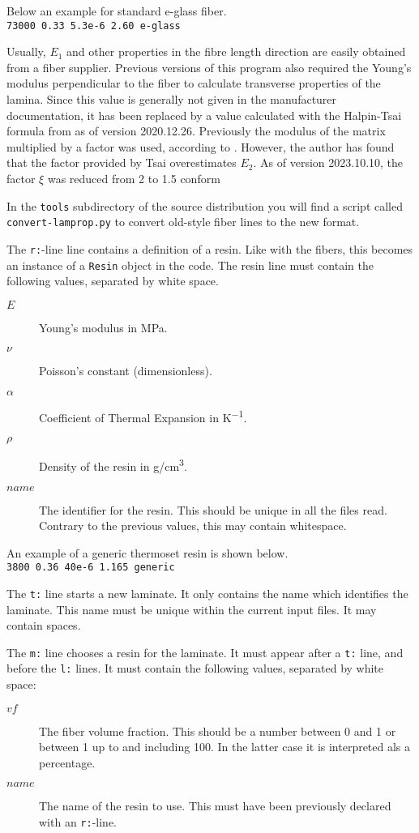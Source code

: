 \documentclass[a4paper,landscape,oneside,11pt,twocolumn]{memoir}
\begin{document}
Below an example for standard e-glass fiber.\\
\texttt{73000 0.33 5.3e-6 2.60 e-glass}

Usually, $E_1$ and other properties in the fibre length direction are easily
obtained from a fiber supplier. Previous versions of this program also
required the Young's modulus perpendicular to the fiber to calculate
transverse properties of the lamina. Since this value is generally not given
in the manufacturer documentation, it has been replaced by
a value calculated with the Halpin-Tsai formula from
\citet[p.  117]{Barbero:2018} as of version 2020.12.26.
Previously the modulus of the matrix multiplied by a factor was used,
according to \citet{Tsai:1992}. However, the author has found that the factor
provided by Tsai overestimates $E_2$.
As of version 2023.10.10, the factor $\xi$ was reduced from 2 to 1.5 conform
\citet{Giner:2014}

In the \texttt{tools} subdirectory of the source distribution you will find
a script called \texttt{convert-lamprop.py} to convert old-style fiber lines
to the new format.

The \texttt{r:}-line line contains a definition of a resin. Like with the
fibers, this becomes an instance of a \texttt{Resin} object in the code. The
resin line must contain the following values, separated by white space.
\begin{description}
    \item[$E$] Young's modulus in \si{MPa}.
    \item[$\nu$] Poisson's constant (dimensionless).
    \item[$\alpha$] Coefficient of Thermal Expansion in \si{K^{-1}}.
    \item[$\rho$] Density of the resin in \si{g/cm^3}.
    \item[$name$] The identifier for the resin. This should be unique in all
        the files read. Contrary to the previous values, this may contain
        whitespace.
\end{description}

An example of a generic thermoset resin is shown below.\\
\texttt{3800 0.36 40e-6 1.165 generic}

The \texttt{t:} line starts a new laminate. It only contains the name which
identifies the laminate. This name must be unique within the current input
files. It may contain spaces.

The \texttt{m:} line chooses a resin for the laminate. It must appear after
a \texttt{t:} line, and before the \texttt{l:} lines. It must contain the
following values, separated by white space:
\begin{description}
    \item[$vf$] The fiber volume fraction. This should be a number between
        0 and 1 or between 1 up to and including 100. In the latter case it
        is interpreted als a percentage.
    \item[$name$] The name of the resin to use. This must have been previously
        declared with an \texttt{r:}-line.
\end{description}
\end{document}
